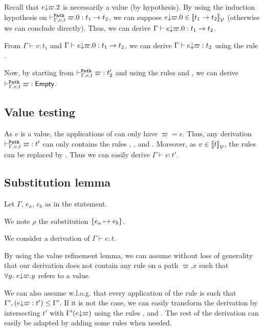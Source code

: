 \documentclass[a4paper]{article}
\theoremstyle{definition}
\begin{document}
\begin{description}
          Recall that $e{\downarrow}\varpi.2$ is necessarily a value (by hypothesis).
          By using the induction hypothesis on $\vdash^{\texttt{Path}}_{\Gamma,e,t} \varpi.0:t_1\to t_2$, we can suppose $e{\downarrow}\varpi.0 \in {\llbracket t_1\to t_2 \rrbracket}_{\mathcal{V}}$ (otherwise we can conclude directly).
          Thus, we can derive $\Gamma \vdash e{\downarrow}\varpi.0: t_1\to t_2$.

          From $\Gamma \vdash v:t_1$ and $\Gamma \vdash e{\downarrow}\varpi.0: t_1\to t_2$, we can derive $\Gamma \vdash e{\downarrow}\varpi: t_2$
          using the rule .

          Now, by starting from $\vdash^{\texttt{Path}}_{\Gamma,e,t} \varpi:t_2'$ and using the rules  and , we can derive
          $\vdash^{\texttt{Path}}_{\Gamma,e,t} \varpi:\textsf{Empty}$.
        \end{description}

        \subsection{Value testing}

        As $v$ is a value, the applications of  can only have $\varpi=\epsilon$.
        Thus, any derivation $\vdash^{\texttt{Path}}_{\Gamma,v,t} \varpi:t'$ can only contains the rules
        , ,  and .
        Moreover, as $v \in {\llbracket t \rrbracket}_{\mathcal{V}}$, the rules  can be replaced by .
        Thus we can easily derive $\Gamma \vdash v:t'$.

        \subsection{Substitution lemma}

        Let $\Gamma$, $e_a$, $e_b$ as in the statement.

        We note $\rho$ the substitution $\{e_a \mapsto e_b\}$.

        We consider a derivation of $\Gamma \vdash e:t$.

        By using the value refinement lemma, we can assume without loss of generality that our derivation does not contain
        any rule  on a path $\varpi.x$ such that $\forall y.\ e{\downarrow}\varpi.y$ refers to a value.

        We can also assume w.l.o.g. that every application of the  rule is such that $\Gamma',(e{\downarrow}\varpi:t') \leq \Gamma'$. If it is not the case,
        we can easily transform the derivation by intersecting $t'$ with $\Gamma'(e{\downarrow}\varpi)$
        using the rules ,  and .
        The rest of the derivation can easily be adapted by adding some  rules when needed.
\end{document}
